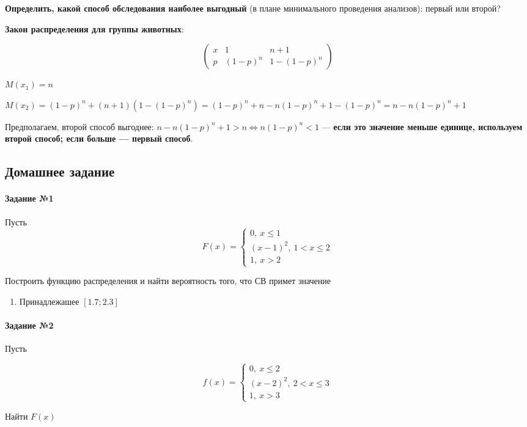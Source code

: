 \documentclass{article}
\begin{document}
\textbf{Определить, какой способ обследования наиболее выгодный} (в плане минимального проведения анализов): первый или второй?

\textbf{Закон распределения для группы животных}:

$$
\begin{pmatrix}
    x & 1 & n + 1 \\
    p & (1-p)^{n} & 1 - (1-p)^{n} 
\end{pmatrix}
$$

$M(x_1) = n$

$M(x_2) = (1-p)^{n} + (n + 1)(1 - (1-p)^{n}) = (1-p)^{n} + n - n(1-p)^{n} + 1 - (1-p)^{n} = n - n(1-p)^{n} + 1$

Предполагаем, второй способ выгоднее: $n - n(1-p)^{n} + 1 > n \Longleftrightarrow n(1-p)^{n} < 1$ — \textbf{если это значение меньше единице, используем второй способ; если больше — первый способ}.

\subsection{Домашнее задание}

\paragraph{Задание №1}

Пусть $$F(x) = \begin{cases}
    0, \ x \le 1 \\
    (x - 1)^2, \ 1 < x \le 2 \\
    1, \ x > 2
\end{cases}
$$

Построить функцию распределения и найти вероятность того, что СВ примет значение

\begin{multicols}{2}
    \begin{enumerate}
        \item Принадлежашее $[1.7; 2.3]$
    \end{enumerate}    
\end{multicols}

\paragraph{Задание №2}

Пусть

$$f(x) = \begin{cases}
    0, \ x \le 2 \\
    (x-2)^2, \ 2 < x \le 3 \\
    1, \ x > 3
\end{cases}$$

Найти $F(x)$
\end{document}
